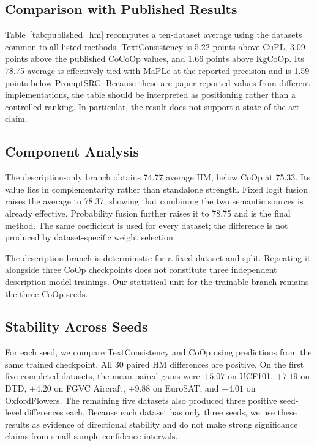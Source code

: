 \documentclass[preprint,12pt]{elsarticle}
\begin{document}
\subsection{Comparison with Published Results}



Table~\ref{tab:published_hm} recomputes a ten-dataset average using the datasets common to all listed methods. TextConsistency is 5.22 points above CuPL, 3.09 points above the published CoCoOp values, and 1.66 points above KgCoOp. Its 78.75 average is effectively tied with MaPLe at the reported precision and is 1.59 points below PromptSRC. Because these are paper-reported values from different implementations, the table should be interpreted as positioning rather than a controlled ranking. In particular, the result does not support a state-of-the-art claim.

\subsection{Component Analysis}
\label{sec:component}



The description-only branch obtains 74.77 average HM, below CoOp at 75.33. Its value lies in complementarity rather than standalone strength. Fixed logit fusion raises the average to 78.37, showing that combining the two semantic sources is already effective. Probability fusion further raises it to 78.75 and is the final method. The same coefficient is used for every dataset; the difference is not produced by dataset-specific weight selection.

The description branch is deterministic for a fixed dataset and split. Repeating it alongside three CoOp checkpoints does not constitute three independent description-model trainings. Our statistical unit for the trainable branch remains the three CoOp seeds.

\subsection{Stability Across Seeds}

For each seed, we compare TextConsistency and CoOp using predictions from the same trained checkpoint. All 30 paired HM differences are positive. On the first five completed datasets, the mean paired gains were $+5.07$ on UCF101, $+7.19$ on DTD, $+4.20$ on FGVC Aircraft, $+9.88$ on EuroSAT, and $+4.01$ on OxfordFlowers. The remaining five datasets also produced three positive seed-level differences each. Because each dataset has only three seeds, we use these results as evidence of directional stability and do not make strong significance claims from small-sample confidence intervals.
\end{document}
